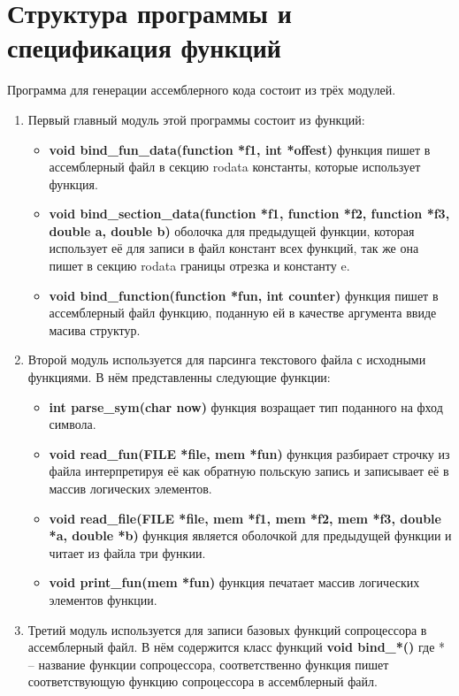 \documentclass[a4paper,12pt,titlepage,finall]{article}
\begin{document}
\newpage

\section{Структура программы и спецификация функций}

Программа для генерации ассемблерного кода состоит из трёх модулей.
\begin{enumerate}
  \item Первый главный модуль этой программы состоит из функций:
  \begin{itemize}
    \item {\bf \ttfamily void bind\_fun\_data(function *f1, int *offest)} функция пишет в ассемблерный файл в секцию rodata константы, которые использует функция.
    \item {\bf \ttfamily void bind\_section\_data(function *f1, function *f2, \newline function *f3, double a, double b)} оболочка для предыдущей функции, которая использует её для записи в файл констант всех функций, так же она пишет в секцию rodata границы отрезка и константу e.
    \item {\bf \ttfamily void bind\_function(function *fun, int counter)} функция пишет в ассемблерный файл функцию, поданную ей в качестве аргумента ввиде масива структур.
  \end{itemize}

  \item Второй модуль используется для парсинга текстового файла с исходными функциями. В нём представленны следующие функции:
  \begin{itemize}
    \item {\bf \ttfamily int parse\_sym(char now)} функция возращает тип поданного на фход символа.
    \item {\bf \ttfamily void read\_fun(FILE *file, mem *fun)} функция разбирает строчку из файла интерпретируя её как обратную польскую запись и записывает её в массив логических элементов.
    \item {\bf \ttfamily void read\_file(FILE *file, mem *f1, mem *f2, mem *f3, \newline double *a, double *b)} функция является оболочкой для предыдущей функции и читает из файла три функии.
    \item {\bf \ttfamily void print\_fun(mem *fun)} функция печатает массив логических элементов функции.
  \end{itemize}
  
  \item Третий модуль используется для записи базовых функций сопроцессора в ассемблерный файл. В нём содержится класс функций {\bf \ttfamily void bind\_*()} где * -- название функции сопроцессора, соответственно функция пишет соответствующую функцию сопроцессора в ассемблерный файл.

\end{enumerate}
\end{document}
